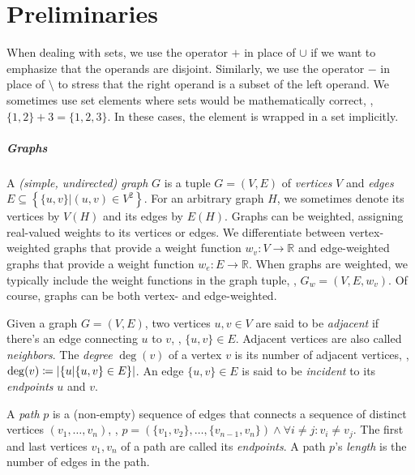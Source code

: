 \chapter{Preliminaries}
\label{chap:preliminaries}



When dealing with sets, we use the operator $+$ in place of $\cup$ if we want to emphasize that the operands are disjoint.
Similarly, we use the operator $-$ in place of $\setminus$ to stress that the right operand is a subset of the left operand.
We sometimes use set elements where sets would be mathematically correct, \eg{}, $\{1,2\} + 3 = \{1,2,3\}$.
In these cases, the element is wrapped in a set implicitly.


\paragraph{Graphs}

A \emph{(simple, undirected) graph} $G$ is a tuple $G = (V, E)$ of \emph{vertices} $V$ and \emph{edges} $E \subseteq \left\{\{u,v\} \vert (u,v) \in V^2 \right\}$.
For an arbitrary graph $H$, we sometimes denote its vertices by $V(H)$ and its edges by $E(H)$.
Graphs can be weighted, assigning real-valued weights to its vertices or edges.
We differentiate between vertex-weighted graphs that provide a weight function $w_v \colon V \to \mathbb{R}$ and edge-weighted graphs that provide a weight function $w_e \colon E \to \mathbb{R}$.
When graphs are weighted, we typically include the weight functions in the graph tuple, \eg{}, $G_w = (V,E,w_v)$.
Of course, graphs can be both vertex- and edge-weighted.

Given a graph $G = (V, E)$, two vertices $u, v \in V$ are said to be \emph{adjacent} if there's an edge connecting $u$ to $v$, \ie{}, $\{u, v\} \in E$.
Adjacent vertices are also called \emph{neighbors}.
The \emph{degree} $\deg(v)$ of a vertex $v$ is its number of adjacent vertices, \ie{}, $\deg(v) \coloneqq \left\lvert\{u \vert \{u,v\} \in E\}\right\rvert$.
An edge $\{u, v\} \in E$ is said to be \emph{incident} to its \emph{endpoints} $u$ and $v$.

A \emph{path} $p$ is a (non-empty) sequence of edges that connects a sequence of distinct vertices $(v_1, \dots, v_n)$, \ie{}, $p = (\{v_1, v_2\}, \dots, \{v_{n-1},v_n\}) \land \forall i \neq j \colon v_i \neq v_j$.
The first and last vertices $v_1, v_n$ of a path are called its \emph{endpoints}.
A path $p$'s \emph{length} is the number of edges in the path.

